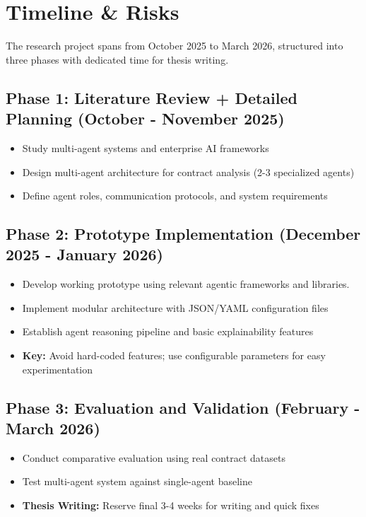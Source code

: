 
\section{Timeline \& Risks}\label{section:schedule}

The research project spans from October 2025 to March 2026, structured into three phases with dedicated time for thesis writing.

\subsection{Phase 1: Literature Review + Detailed Planning (October - November 2025)}

\begin{itemize}
    \item Study multi-agent systems and enterprise AI frameworks
    \item Design multi-agent architecture for contract analysis (2-3 specialized agents)
    \item Define agent roles, communication protocols, and system requirements
\end{itemize}

\subsection{Phase 2: Prototype Implementation (December 2025 - January 2026)}

\begin{itemize}
    \item Develop working prototype using relevant agentic frameworks and libraries.
    \item Implement modular architecture with JSON/YAML configuration files
    \item Establish agent reasoning pipeline and basic explainability features
    \item \textbf{Key:} Avoid hard-coded features; use configurable parameters for easy experimentation
\end{itemize}

\subsection{Phase 3: Evaluation and Validation (February - March 2026)}

\begin{itemize}
    \item Conduct comparative evaluation using real contract datasets
    \item Test multi-agent system against single-agent baseline
    \item \textbf{Thesis Writing:} Reserve final 3-4 weeks for writing and quick fixes
\end{itemize}

